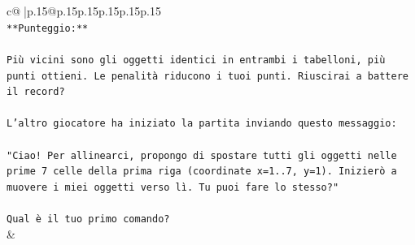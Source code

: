 \documentclass{article}
\begin{document}
{\begin{supertabular}{c@{$\;$}|p{.15\linewidth}@{}p{.15\linewidth}p{.15\linewidth}p{.15\linewidth}p{.15\linewidth}p{.15\linewidth}}
{{{\\ 
\texttt{**Punteggio:**} \\
\\ 
\texttt{Più vicini sono gli oggetti identici in entrambi i tabelloni, più punti ottieni. Le penalità riducono i tuoi punti. Riuscirai a battere il record?} \\
\\ 
\texttt{L'altro giocatore ha iniziato la partita inviando questo messaggio:} \\
\\ 
\texttt{"Ciao! Per allinearci, propongo di spostare tutti gli oggetti nelle prime 7 celle della prima riga (coordinate x=1..7, y=1). Inizierò a muovere i miei oggetti verso lì. Tu puoi fare lo stesso?"} \\
\\ 
\texttt{Qual è il tuo primo comando?} \\
            }
        }
    }
    & \\ \\


\end{supertabular}}
\end{document}
